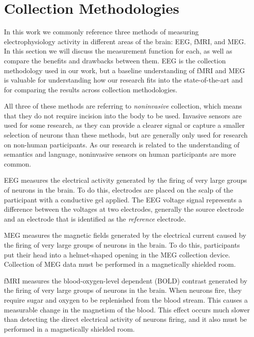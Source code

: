 \section{Collection Methodologies}
\label{chapter:introduction:sec:collection}

In this work we commonly reference three methods of measuring electrophysiology 
activity in different areas of the brain: EEG, fMRI, and MEG. In this section 
we will discuss the measurement function for each, as well as compare the 
benefits and drawbacks between them. EEG is the collection methodology used in 
our work, but a baseline understanding of fMRI and MEG is valuable for 
understanding how our research fits into the state-of-the-art and for comparing 
the results across collection methodologies.

All three of these methods are referring to \emph{noninvasive} collection, 
which means that they do not require incision into the body to be used.  
Invasive sensors are used for some research, as they can provide a clearer 
signal or capture a smaller selection of neurons than these methods, but are 
generally only used for research on non-human participants. As our research is 
related to the understanding of semantics and language, noninvasive sensors on 
human participants are more common.

EEG measures the electrical activity generated by the firing of very large 
groups of neurons in the brain. To do this, electrodes are placed on the scalp 
of the participant with a conductive gel applied. The EEG voltage signal 
represents a difference between the voltages at two electrodes, generally the 
source electrode and an electrode that is identified as the \emph{reference} 
electrode.

MEG measures the magnetic fields generated by the electrical current caused by 
the firing of very large groups of neurons in the brain. To do this, 
participants put their head into a helmet-shaped opening in the MEG collection 
device.  Collection of MEG data must be performed in a magnetically shielded 
room.

fMRI measures the blood-oxygen-level dependent (BOLD) contrast generated by the 
firing of very large groups of neurons in the brain. When neurons fire, they 
require sugar and oxygen to be replenished from the blood stream. This causes a 
measurable change in the magnetism of the blood. This effect occurs much slower 
than detecting the direct electrical activity of neurons firing, and it also 
must be performed in a magnetically shielded room.

